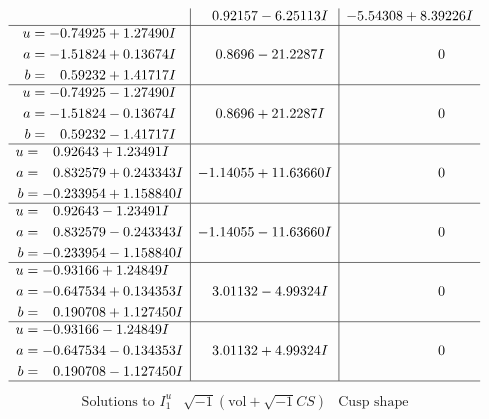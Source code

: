\documentclass[1p]{elsarticle_modified}
\theoremstyle{definition}
\newcommand{\I}{\sqrt{-1}}
\begin{document}
$$\begin{array}{c|c|c}
 & \phantom{-}0.92157 - 6.25113 I & -5.54308 + 8.39226 I \\ \hline\begin{aligned}
u &= -0.74925 + 1.27490 I \\
a &= -1.51824 + 0.13674 I \\
b &= \phantom{-}0.59232 + 1.41717 I\end{aligned}
 & \phantom{-}0.8696 - 21.2287 I & \phantom{-0.000000 } 0 \\ \hline\begin{aligned}
u &= -0.74925 - 1.27490 I \\
a &= -1.51824 - 0.13674 I \\
b &= \phantom{-}0.59232 - 1.41717 I\end{aligned}
 & \phantom{-}0.8696 + 21.2287 I & \phantom{-0.000000 } 0 \\ \hline\begin{aligned}
u &= \phantom{-}0.92643 + 1.23491 I \\
a &= \phantom{-}0.832579 + 0.243343 I \\
b &= -0.233954 + 1.158840 I\end{aligned}
 & -1.14055 + 11.63660 I & \phantom{-0.000000 } 0 \\ \hline\begin{aligned}
u &= \phantom{-}0.92643 - 1.23491 I \\
a &= \phantom{-}0.832579 - 0.243343 I \\
b &= -0.233954 - 1.158840 I\end{aligned}
 & -1.14055 - 11.63660 I & \phantom{-0.000000 } 0 \\ \hline\begin{aligned}
u &= -0.93166 + 1.24849 I \\
a &= -0.647534 + 0.134353 I \\
b &= \phantom{-}0.190708 + 1.127450 I\end{aligned}
 & \phantom{-}3.01132 - 4.99324 I & \phantom{-0.000000 } 0 \\ \hline\begin{aligned}
u &= -0.93166 - 1.24849 I \\
a &= -0.647534 - 0.134353 I \\
b &= \phantom{-}0.190708 - 1.127450 I\end{aligned}
 & \phantom{-}3.01132 + 4.99324 I & \phantom{-0.000000 } 0\\
 \hline 
 \end{array}$$\newpage$$\begin{array}{c|c|c}  
\text{Solutions to }I^u_{1}& \I (\text{vol} + \sqrt{-1}CS) & \text{Cusp shape}\\

\end{array}$$
\end{document}
